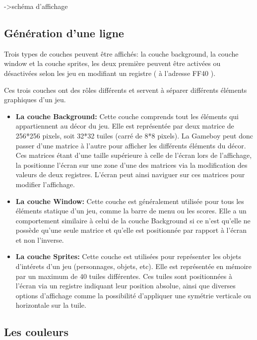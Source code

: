 \documentclass{report}
\begin{document}
->schéma d'affichage

\subsection{Génération d'une ligne}

Trois types de couches peuvent être affichés: la couche background, la couche
window et la couche sprites, les deux première peuvent être activées ou
désactivées selon les jeu en modifiant un registre ( à l'adresse FF40 ).

Ces trois couches ont des rôles différents et servent à séparer différents
éléments graphiques d'un jeu.\\

\begin{itemize}
\item \textbf{La couche Background:}
	Cette couche comprends tout les éléments qui appartiennent au décor du
jeu. Elle est représentée par deux matrice de 256*256 pixels, soit 32*32
tuiles (carré de 8*8 pixels). La Gameboy peut donc passer d'une matrice à
l'autre pour afficher les différents éléments du décor. Ces matrices étant
d'une taille supérieure à celle de l'écran lors de l'affichage, la positionne
l'écran sur une zone d'une des matrices via la modification des valeurs de
deux registres. L'écran peut ainsi naviguer sur ces matrices pour modifier
l'affichage.\\

\item \textbf{La couche Window:}
	Cette couche est généralement utilisée pour tous les éléments statique
d'un jeu, comme la barre de menu ou les scores. Elle a un comportement
similaire à celui de la couche Background si ce n'est qu'elle ne possède qu'une seule
matrice et qu'elle est positionnée par rapport à l'écran et non l'inverse.\\

\item \textbf{La couche Sprites:}
	Cette couche est utilisées pour représenter les objets d'intérets d'un
jeu (personnages, objets, etc). Elle est représentée en mémoire par un maximum
de 40 tuiles différentes. Ces tuiles sont positionnées à l'écran via un registre indiquant leur position absolue, ainsi que diverses options d'affichage comme la possibilité d'appliquer une symétrie verticale ou horizontale sur la tuile.\\
\end{itemize}

\subsection{Les couleurs}
\end{document}
